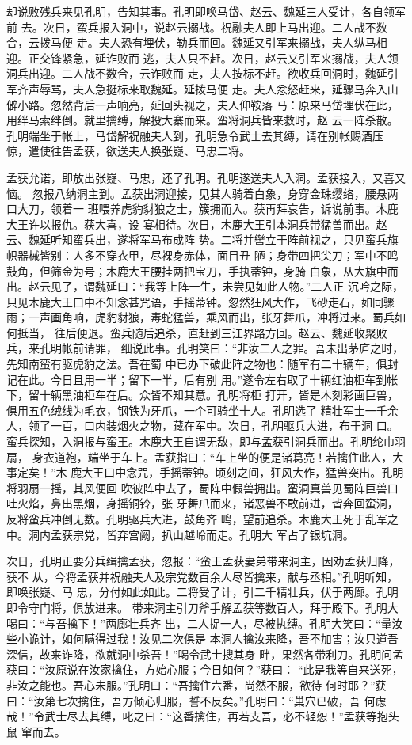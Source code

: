 却说败残兵来见孔明，告知其事。孔明即唤马岱、赵云、魏延三人受计，各自领军前
去。次日，蛮兵报入洞中，说赵云搦战。祝融夫人即上马出迎。二人战不数合，云拨马便
走。夫人恐有埋伏，勒兵而回。魏延又引军来搦战，夫人纵马相迎。正交锋紧急，延诈败而
逃，夫人只不赶。次日，赵云又引军来搦战，夫人领洞兵出迎。二人战不数合，云诈败而
走，夫人按标不赶。欲收兵回洞时，魏延引军齐声辱骂，夫人急挺标来取魏延。延拨马便
走。夫人忿怒赶来，延骤马奔入山僻小路。忽然背后一声响亮，延回头视之，夫人仰鞍落
马：原来马岱埋伏在此，用绊马索绊倒。就里擒缚，解投大寨而来。蛮将洞兵皆来救时，赵
云一阵杀散。孔明端坐于帐上，马岱解祝融夫人到，孔明急令武士去其缚，请在别帐赐酒压
惊，遣使往告孟获，欲送夫人换张嶷、马忠二将。

孟获允诺，即放出张嶷、马忠，还了孔明。孔明遂送夫人入洞。孟获接入，又喜又恼。
忽报八纳洞主到。孟获出洞迎接，见其人骑着白象，身穿金珠缨络，腰悬两口大刀，领着一
班喂养虎豹豺狼之士，簇拥而入。获再拜哀告，诉说前事。木鹿大王许以报仇。获大喜，设
宴相待。次日，木鹿大王引本洞兵带猛兽而出。赵云、魏延听知蛮兵出，遂将军马布成阵
势。二将并辔立于阵前视之，只见蛮兵旗帜器械皆别：人多不穿衣甲，尽裸身赤体，面目丑
陋；身带四把尖刀；军中不鸣鼓角，但筛金为号；木鹿大王腰挂两把宝刀，手执蒂钟，身骑
白象，从大旗中而出。赵云见了，谓魏延曰：“我等上阵一生，未尝见如此人物。”二人正
沉吟之际，只见木鹿大王口中不知念甚咒语，手摇蒂钟。忽然狂风大作，飞砂走石，如同骤
雨；一声画角响，虎豹豺狼，毒蛇猛兽，乘风而出，张牙舞爪，冲将过来。蜀兵如何抵当，
往后便退。蛮兵随后追杀，直赶到三江界路方回。赵云、魏延收聚败兵，来孔明帐前请罪，
细说此事。孔明笑曰：“非汝二人之罪。吾未出茅庐之时，先知南蛮有驱虎豹之法。吾在蜀
中已办下破此阵之物也：随军有二十辆车，俱封记在此。今日且用一半；留下一半，后有别
用。”遂令左右取了十辆红油柜车到帐下，留十辆黑油柜车在后。众皆不知其意。孔明将柜
打开，皆是木刻彩画巨兽，俱用五色绒线为毛衣，钢铁为牙爪，一个可骑坐十人。孔明选了
精壮军士一千余人，领了一百，口内装烟火之物，藏在军中。次日，孔明驱兵大进，布于洞
口。蛮兵探知，入洞报与蛮王。木鹿大王自谓无敌，即与孟获引洞兵而出。孔明纶巾羽扇，
身衣道袍，端坐于车上。孟获指曰：“车上坐的便是诸葛亮！若擒住此人，大事定矣！”木
鹿大王口中念咒，手摇蒂钟。顷刻之间，狂风大作，猛兽突出。孔明将羽扇一摇，其风便回
吹彼阵中去了，蜀阵中假兽拥出。蛮洞真兽见蜀阵巨兽口吐火焰，鼻出黑烟，身摇铜铃，张
牙舞爪而来，诸恶兽不敢前进，皆奔回蛮洞，反将蛮兵冲倒无数。孔明驱兵大进，鼓角齐
鸣，望前追杀。木鹿大王死于乱军之中。洞内孟获宗党，皆弃宫阙，扒山越岭而走。孔明大
军占了银坑洞。

次日，孔明正要分兵缉擒孟获，忽报：“蛮王孟获妻弟带来洞主，因劝孟获归降，获不
从，今将孟获并祝融夫人及宗党数百余人尽皆擒来，献与丞相。”孔明听知，即唤张嶷、马
忠，分付如此如此。二将受了计，引二千精壮兵，伏于两廊。孔明即令守门将，俱放进来。
带来洞主引刀斧手解孟获等数百人，拜于殿下。孔明大喝曰：“与吾擒下！”两廊壮兵齐
出，二人捉一人，尽被执缚。孔明大笑曰：“量汝些小诡计，如何瞒得过我！汝见二次俱是
本洞人擒汝来降，吾不加害；汝只道吾深信，故来诈降，欲就洞中杀吾！”喝令武士搜其身
畔，果然各带利刀。孔明问孟获曰：“汝原说在汝家擒住，方始心服；今日如何？”获曰：
“此是我等自来送死，非汝之能也。吾心未服。”孔明曰：“吾擒住六番，尚然不服，欲待
何时耶？”获曰：“汝第七次擒住，吾方倾心归服，誓不反矣。”孔明曰：“巢穴已破，吾
何虑哉！”令武士尽去其缚，叱之曰：“这番擒住，再若支吾，必不轻恕！”孟获等抱头鼠
窜而去。

